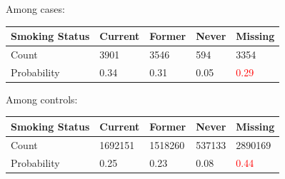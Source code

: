\documentclass[12pt]{article}
\newcommand{\note}[1]{\textcolor{red}{#1}}
\begin{document}
Among cases:
\begin{center}
\begin{tabular}{|l|l|l|l|l|}
\hline
\textbf{Smoking Status} & Current & Former & Never & Missing \\ \hline
Count & 3901 & 3546 & 594 & 3354 \\ \hline
Probability & 0.34 & 0.31 & 0.05 & \note{0.29} \\ \hline
\end{tabular}
\end{center}

Among controls:
\begin{center}
\begin{tabular}{|l|l|l|l|l|}
\hline
\textbf{Smoking Status} & Current & Former & Never & Missing \\ \hline
Count & 1692151 & 1518260 & 537133 & 2890169 \\ \hline
Probability & 0.25 & 0.23 & 0.08 & \note{0.44} \\ \hline
\end{tabular}
\end{center}

\pagebreak
\end{document}
